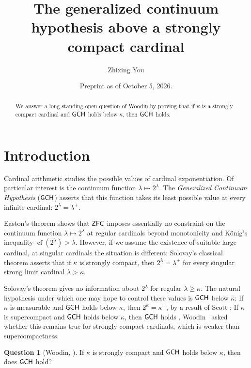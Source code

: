 \documentclass[11pt,reqno]{amsart}
\theoremstyle{definition}
\newtheorem{q}{Question}
\theoremstyle{remark}
\DeclareMathOperator{\cf}{cf}
\newcommand*\axiomfont[1]{\textsf{\textup{#1}}}
\newcommand\zfc{\axiomfont{ZFC}}
\newcommand\gch{\axiomfont{GCH}}
\begin{document}
\title[GCH above a strongly compact cardinal]{The generalized continuum hypothesis above a strongly compact cardinal}
\author{Zhixing You}
\address{Einstein Institute of Mathematics, The Hebrew University of Jerusalem, Israel}

\date{Preprint as of October 5, 2026.}

\begin{abstract}
    We answer a long-standing open question of Woodin
    by proving that if $\kappa$ is a strongly compact cardinal and $\gch$ holds below $\kappa$, then $\gch$ holds.
\end{abstract}
\maketitle

\section{Introduction}
Cardinal arithmetic studies the possible values of cardinal exponentiation.
Of particular interest is the continuum function $\lambda\mapsto 2^\lambda$.
The \emph{Generalized Continuum Hypothesis} ($\gch$) asserts that this function
takes its least possible value at every infinite cardinal:
$2^\lambda=\lambda^+$.

Easton's theorem \cite[Theorem~10.7]{Kanamori} shows that $\zfc$ imposes essentially no constraint
on the continuum function $\lambda\mapsto 2^\lambda$ at regular cardinals
beyond monotonicity and K\"onig's inequality $\cf(2^\lambda)>\lambda$.
However, if we assume the existence of suitable large cardinal, at singular cardinals the situation is different:
Solovay's classical theorem \cite[p.~308]{Kanamori} asserts that if $\kappa$ is strongly compact,
then $2^\lambda=\lambda^+$ for every singular strong limit cardinal $\lambda>\kappa$.

Solovay's theorem gives no information about $2^\lambda$ for regular $\lambda \geq \kappa$.
The natural hypothesis under which one may hope to control these values is $\gch$ below $\kappa$:
If $\kappa$ is measurable and $\gch$ holds below $\kappa$, then $2^\kappa=\kappa^+$,
by a result of Scott \cite[Corollary~5.8]{Kanamori};
If $\kappa$ is supercompact and $\gch$ holds below $\kappa$,
then $\gch$ holds \cite[Proposition~22.2]{Kanamori}.
Woodin~\cite{Apter2000} asked whether this remains true for strongly compact cardinals, which
is weaker than supercompactness.
\begin{q}[Woodin, {\cite{Apter2000}}]\label{qwoodin}
    If $\kappa$ is strongly compact and $\gch$ holds below $\kappa$, then does $\gch$ hold?
\end{q}
\end{document}
